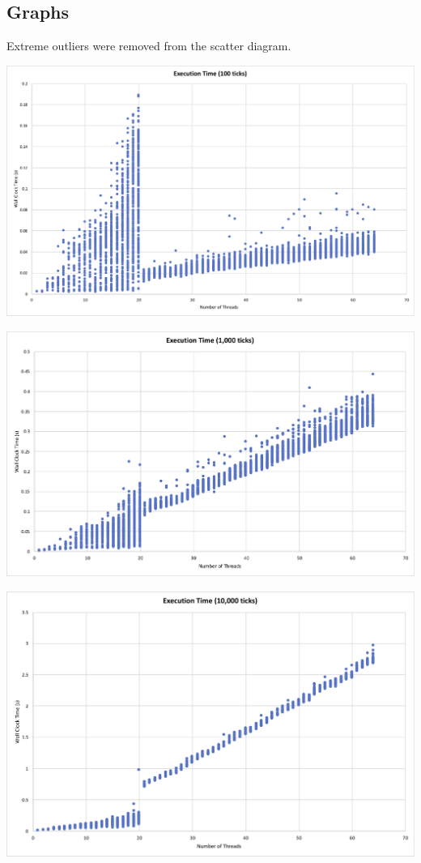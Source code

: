 \documentclass[a4paper,12pt]{article}
\begin{document}
	\subsection{Graphs}
	Extreme outliers were removed from the scatter diagram.
	\begin{center}
		\centering
		\includegraphics[width=\linewidth]{100-time}
	\end{center}
	\begin{center}
		\centering
		\includegraphics[width=\linewidth]{1000-time}
	\end{center}
	\begin{center}
		\centering
		\includegraphics[width=\linewidth]{10000-time}
	\end{center}
	
\end{document}

